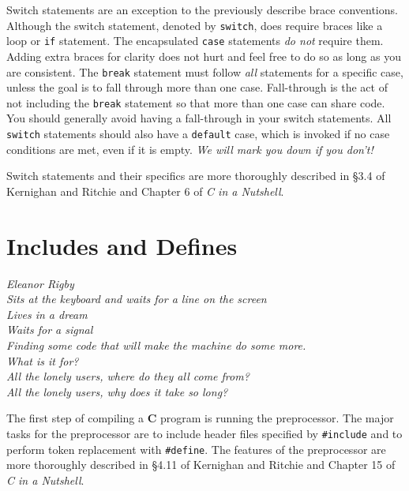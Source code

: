 \documentclass[11pt]{article}
\begin{document}
Switch statements are an exception to the previously describe brace conventions.
Although the switch statement, denoted by \texttt{switch}, does require braces
like a loop or \texttt{if} statement. The encapsulated \texttt{case} statements
\emph{do not} require them. Adding extra braces for clarity does not hurt and
feel free to do so as long as you are consistent. The \texttt{break} statement
must follow \emph{all} statements for a specific case, unless the goal is to
fall through more than one case.  Fall-through is the act of not including the
\texttt{break} statement so that more than one case can share code. You should
generally avoid having a fall-through in your switch statements. All
\texttt{switch} statements should also have a \texttt{default} case, which is
invoked if no case conditions are met, even if it is empty. \emph{We will mark you down if you don't!}


Switch statements and their specifics are more thoroughly described in \S 3.4 of
Kernighan and Ritchie and Chapter 6 of \emph{C in a Nutshell}.


\section{Includes and Defines}

\textwidth
\epigraph{\emph{Eleanor Rigby \\
Sits at the keyboard and waits for a line on the screen \\
Lives in a dream \\
Waits for a signal \\
Finding some code that will make the machine do some more.  \\
What is it for? \\
All the lonely users, where do they all come from? \\
All the lonely users, why does it take so long?}}{}

\noindent The first step of compiling a \textbf{C} program is running the
preprocessor. The major tasks for the preprocessor are to include header files
specified by \texttt{\#include} and to perform token replacement with
\texttt{\#define}. The features of the preprocessor are more thoroughly
described in \S 4.11 of Kernighan and Ritchie and Chapter 15 of \emph{C in a
Nutshell}.\\
\end{document}
